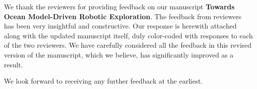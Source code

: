 \documentclass[10pt,stdletter]{newlfm}
\begin{document}
\begin{newlfm}


  We thank the reviewers for providing feedback on our manuscript
  \textbf{Towards Ocean Model-Driven Robotic Exploration}. The
  feedback from reviewers has been very insightful and
  constructive. Our response is herewith attached along with the
  updated manuscript itself, duly color-coded with responses to each
  of the two reviewers. We have carefully considered all the feedback
  in this revised version of the manuscript, which we believe, has
  significantly improved as a result.

  We look forward to receiving any further feedback at the earliest.


\end{newlfm}
\vspace{-1cm}
\end{document}
